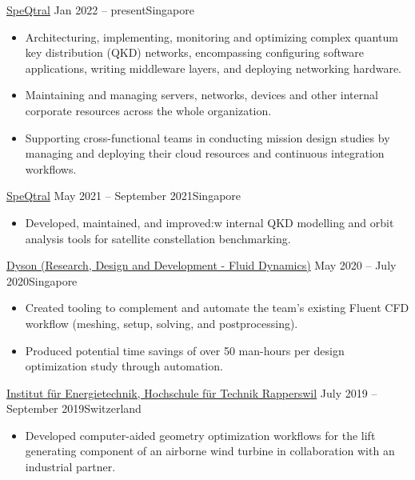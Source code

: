 \documentclass[10.5pt,a4paper,ragged2e,withhyper]{altacv}
\begin{document}
\begin{paracol}{2}


  {\href{https://speqtralquantum.com}{SpeQtral}}
  {Jan 2022 -- present}{Singapore}
\begin{itemize}
\item Architecturing, implementing, monitoring and optimizing complex quantum key distribution (QKD) networks, encompassing configuring software applications, writing middleware layers, and deploying networking hardware.
\item Maintaining and managing servers, networks, devices and other internal corporate resources across the whole organization.
\item Supporting cross-functional teams in conducting mission design studies by managing and deploying their cloud resources and continuous integration workflows.
\end{itemize}

\medskip

  {\href{https://speqtralquantum.com}{SpeQtral}}
  {May 2021 -- September 2021}{Singapore}
\begin{itemize}
\item Developed, maintained, and improved:w
  internal QKD modelling and orbit analysis tools for satellite constellation benchmarking.
\end{itemize}

\divider

  {\href{https://careers.dyson.com/en-gb/what-you-can-do/engineer/research/}{Dyson (Research, Design and Development - Fluid Dynamics)}}
  {May 2020 -- July 2020}{Singapore}
\begin{itemize}
\item Created tooling to complement and automate the team's existing Fluent CFD workflow (meshing, setup, solving, and postprocessing).
\item Produced potential time savings of over 50 man-hours per design optimization study through automation.
\end{itemize}

\divider

  {\href{https://www.ost.ch/de/forschung-und-dienstleistungen/technik/erneuerbare-energien-und-umwelttechnik/iet-institut-fuer-energietechnik}{Institut für Energietechnik, Hochschule für Technik Rapperswil}}
  {July 2019 -- September 2019}{Switzerland}
\begin{itemize}
\item Developed computer-aided geometry optimization workflows for the lift generating component of an airborne wind turbine in collaboration with an industrial partner.
\end{itemize}


\end{paracol}
\end{document}

